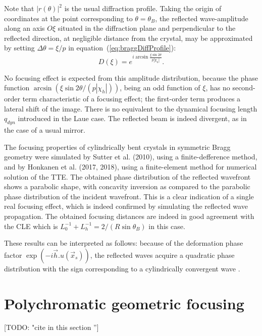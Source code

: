 \documentclass[preprint]{iucr}              %
\newcommand{\todo}[1]{{\color{red}[TODO: "#1'']}}
\newcommand{\inred}[1]{{\color{red}#1}}
\begin{document}
Note that $|r(\theta)|^2$ is the usual diffraction profile. Taking the origin of coordinates at the point corresponding to $\theta=\theta_B$, the reflected wave-amplitude along an axis $O\xi$ situated in the diffraction plane and perpendicular to the reflected direction, at negligible distance from the crystal, may be approximated by setting  $\Delta\theta=\xi/p$ in equation~(\ref{eq:braggDiffProfile}):
\begin{equation}
    D(\xi) = e^{i \arcsin{\frac{\xi \sin2\theta}{p |\chi_h|}}}.
\end{equation}

No focusing effect is expected from this amplitude distribution, because the phase function $\arcsin(\xi \sin2\theta/ (p |\chi_h|))$, being an odd function of $\xi$, has no second-order term characteristic of a focusing effect; the first-order term produces a lateral shift of the image. There is no equivalent to the dynamical focusing length $q_{dyn}$ introduced in the Laue case. The reflected beam is indeed divergent, as in the case of a usual mirror.

The focusing properties of cylindrically bent crystals in symmetric Bragg geometry were simulated by Sutter et al. (2010), using a finite-defference method, and by Honkanen et al. (2017, 2018), using a finite-element method for numerical solution of the TTE. The obtained phase distribution of the reflected wavefront shows a parabolic shape, with concavity inversion as compared to the parabolic phase distribution of the incident wavefront. This is a clear indication of a single real focusing effect, which is indeed confirmed by simulating the reflected wave propagation. The obtained focusing distances are indeed in good agreement with the CLE which is $L_0^{-1}+L_h^{-1}=2/(R \sin\theta_B)$ in this case.

These results can be interpreted as follows: because of the deformation phase factor $\exp(-i\vec h. u(\vec x_s))$, the reflected waves acquire a quadratic phase distribution with the sign corresponding to a cylindrically convergent wave \inred{\cite{Honkanen2018}}.



\section{Polychromatic \inred{geometric} focusing}
\label{sec:polychromatic}

\todo{cite in this section \cite{XianboSPIE}}
\end{document}
